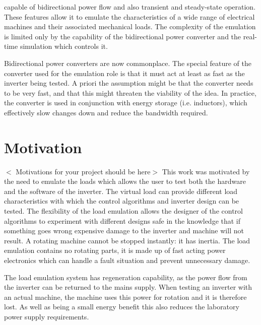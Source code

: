 capable of bidirectional power flow and also transient and steady-state operation. These features allow it to emulate the characteristics of a wide range of electrical machines and their associated mechanical loads. The complexity of the emulation is limited only by the
capability of the bidirectional power converter and the real-time simulation which controls it.\par
Bidirectional power converters are now commonplace. The special feature of the converter used for the emulation role is that it must act at least as fast as the inverter being tested. A priori the assumption might be that the converter needs to be very fast, and that this
might threaten the viability of the idea. In practice, the converter is used in conjunction with energy storage (i.e. inductors), which effectively slow changes down and reduce the bandwidth required.\par
\section{Motivation}
$<$ Motivations for your project should be here$>$\newline
This work was motivated by the need to emulate the loads which allows the user to test both the hardware and the software of the inverter. The virtual load can provide different load characteristics with which the control algorithms and inverter design can be
tested. The flexibility of the load emulation allows the designer of the control algorithms to experiment with different designs safe in the knowledge that if something goes wrong expensive damage to the inverter and machine will not result. A rotating machine cannot be stopped instantly: it has inertia. The load emulation contains no rotating parts, it is made up of fast acting power electronics which can handle a fault situation and prevent unnecessary damage.\par
The load emulation system has regeneration capability, as the power flow from the inverter can be returned to the mains supply. When testing an inverter with an actual machine, the machine uses this power for rotation and it is therefore lost. As well as being a small energy benefit this also reduces the laboratory power supply requirements.
